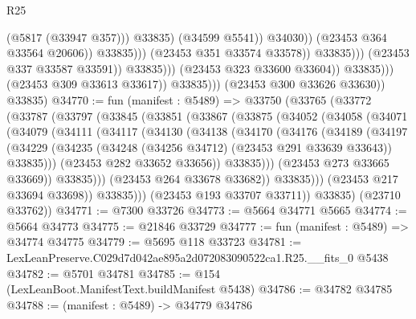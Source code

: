 \begin{lexlean}{R25}
\begin{coremodule}
                                                          (@5817 (@33947 @357)))
                                                        @33835)
                                                      (@34599 @5541))
                                                    @34030))
                                                (@23453 @364 @33564 @20606))
                                              @33835)))
                                        (@23453 @351 @33574 @33578))
                                      @33835)))
                                (@23453 @337 @33587 @33591))
                              @33835)))
                        (@23453 @323 @33600 @33604))
                      @33835)))
                (@23453 @309 @33613 @33617))
              @33835)))
        (@23453 @300 @33626 @33630))
      @33835)
@34770 := fun (manifest : @5489) =>
  @33750
    (@33765
      (@33772
        (@33787
          (@33797
            (@33845
              (@33851
                (@33867
                  (@33875
                    (@34052
                      (@34058
                        (@34071
                          (@34079
                            (@34111
                              (@34117
                                (@34130
                                  (@34138
                                    (@34170
                                      (@34176
                                        (@34189
                                          (@34197
                                            (@34229
                                              (@34235
                                                (@34248 (@34256 @34712) (@23453 @291 @33639 @33643))
                                                @33835)))
                                          (@23453 @282 @33652 @33656))
                                        @33835)))
                                  (@23453 @273 @33665 @33669))
                                @33835)))
                          (@23453 @264 @33678 @33682))
                        @33835)))
                  (@23453 @217 @33694 @33698))
                @33835)))
          (@23453 @193 @33707 @33711))
        @33835)
      (@23710 @33762))
@34771 := @7300 @33726
@34773 := @5664 @34771 @5665
@34774 := @5664 @34773
@34775 := @21846 @33729
@34777 := fun (manifest : @5489) => @34774 @34775
@34779 := @5695 @118 @33723
@34781 := LexLeanPreserve.C029d7d042ae895a2d072083090522ca1.R25.__fits_0 @5438
@34782 := @5701 @34781
@34785 := @154 (LexLeanBoot.ManifestText.buildManifest @5438)
@34786 := @34782 @34785
@34788 := (manifest : @5489) -> @34779 @34786

\end{coremodule}
\end{lexlean}
